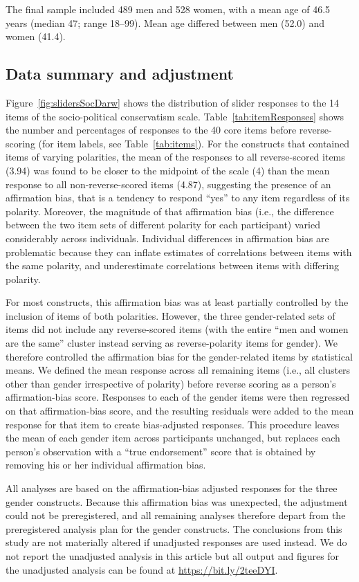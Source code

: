 \documentclass[fignum,man]{apa}\usepackage[]{graphicx}\usepackage[]{color}
\begin{document}
The final sample included 489 men and 528 women, with a mean age of 
46.5 years
 (median 47;
range 18--99). 
Mean age differed between men (52.0) and women (41.4). 


\subsection{Data summary and adjustment}
Figure~\ref{fig:slidersSocDarw} shows the distribution
of slider responses to the 14 items of the socio-political conservatism scale.
Table~\ref{tab:itemResponses}
shows the number and percentages of responses to the 40 core
items before
reverse-scoring (for item labels, see Table~\ref{tab:items}).
For the constructs that contained items of varying polarities,
the mean of the responses to all reverse-scored items (3.94)
was found to be 
closer to the midpoint of the scale (4) than the mean response to all non-reverse-scored
items (4.87), suggesting the presence of an
affirmation bias, that is a tendency to respond ``yes'' to any item regardless of
its polarity. Moreover, the magnitude of that affirmation bias (i.e., the difference 
between the two item sets of different polarity for each participant) varied
considerably across individuals. Individual differences in 
affirmation bias are problematic because they can inflate estimates
of correlations between items with the same polarity, and 
underestimate correlations between items with differing polarity.

For most constructs, this affirmation bias was at least partially controlled
by the inclusion of items of both polarities. However, the three gender-related sets 
of items did not include any reverse-scored items (with the entire ``men and women are the same''
cluster instead serving as reverse-polarity items for gender). 
We therefore
controlled the affirmation
bias for the gender-related items by statistical means.
We defined the mean response across all remaining items (i.e., all clusters other than
gender irrespective of polarity) before reverse scoring
as a person's affirmation-bias score. 
Responses to each of the gender items were then regressed
on that affirmation-bias score, and the resulting residuals were added
to the mean response for that item to create bias-adjusted responses. 
This procedure leaves the mean of each gender item across participants unchanged,
but replaces each person's observation with a ``true endorsement'' score that
is obtained by removing his or her individual affirmation bias.

All
analyses are based on the affirmation-bias adjusted responses for the three 
gender constructs.
Because this affirmation bias was unexpected, the
adjustment could not be preregistered, and all remaining analyses
therefore depart from the preregistered analysis plan for the gender
constructs. The conclusions from this study are not materially altered if 
unadjusted responses are used instead. We do not report the 
unadjusted analysis in this article but all output and figures for the unadjusted
analysis can be found at \url{https://bit.ly/2teeDYI}.
\end{document}
